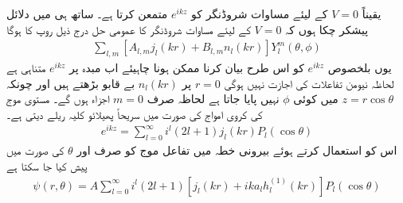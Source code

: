 یقیناً \(V=0\) کے لیئے مساوات شروڈنگر کو \(e^{ikz}\) متمعن کرتا ہے۔ ساتھ ہی میں دلائل پیشکر چکا ہوں کہ \(V=0\) کے لیئے مساوات شروڈنگر کا عمومی حل درج ذیل روپ کا ہوگا
\begin{align*}
	\sum_{l, m}\left[A_{l, m}j_l(kr)+B_{l, m}n_l(kr)\right]Y_l^m(\theta, \phi)
\end{align*}
یوں بلخصوص \(e^{ikz}\) کو اس طرح بیان کرنا ممکن ہونا چاہیئے اب مبدہ پر \(e^{ikz}\) متناہی ہے لحاظہ نیومن تفاعلات کی اجازت نہیں ہوگی \(r=0\) پر \(n_l(kr)\) بے قابو بڑھتے ہیں اور چونکہ \(z=r\cos\theta\) میں کوئی \(\phi\) نہیں پایا جاتا ہے لحاظہ صرف \(m=0\) اجزاء ہوں گے۔ مستوی موج کی کروی امواج کی صورت میں سریحاً پھیلائو کلیہ ریلے دیتی ہے۔
\begin{align}
	e^{ikz} = \sum_{l=0}^{\infty}i^l(2l+1)j_l(kr)P_l(\cos\theta)
\end{align}
اس کو استعمال کرتے ہوئے بیرونی خطہ میں تفاعل موج کو صرف  اور \(\theta\) کی صورت میں پیش کیا جا سکتا ہے
\begin{align}
	\psi(r, \theta) = A\sum_{l=0}^{\infty}i^l(2l+1)\left[j_l(kr)+ika_lh_l^{(1)}(kr)\right]P_l(\cos\theta)
\end{align}


